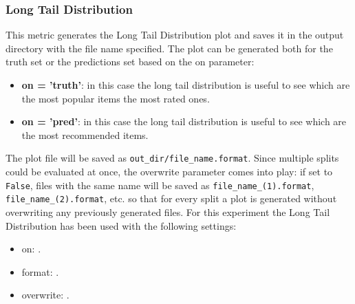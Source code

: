 \documentclass[11pt]{article}
\begin{document}
\subsubsection{Long Tail Distribution}\label{subsubsec:ltd}
This metric generates the Long Tail Distribution plot and saves it in the output directory with the file name
specified.
The plot can be generated both for the truth set or the predictions set based on the on parameter:
\begin{itemize}
    \item \textbf{on = 'truth'}: in this case the long tail distribution is useful to see which are the most popular items
       the most rated ones.
    \item \textbf{on = 'pred'}: in this case the long tail distribution is useful to see which are the most recommended
        items.
\end{itemize}
\hfill\break
\hfill\break
The plot file will be saved as \texttt{out\_dir/file\_name.format}.
Since multiple splits could be evaluated at once, the overwrite parameter comes into play:
if set to \texttt{False}, files with the same name will be saved as \texttt{file\_name\_(1).format}, \texttt{file\_name\_(2).format}, etc.
so that for every split a plot is generated without overwriting any previously generated files.
\hfill\break
\hfill\break
For this experiment the Long Tail Distribution has been used with the following settings:
\begin{itemize}
    \item on: .
    \item format: .
    \item overwrite: .
\end{itemize}
\hfill\break
\hfill\break

\end{document}
